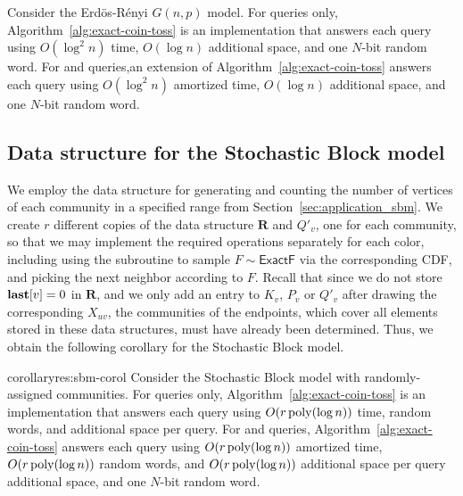 \begin{theorem}
Consider the Erd\"{o}s-R\'{e}nyi $G(n,p)$ model. For  queries only, Algorithm~\ref{alg:exact-coin-toss} is an implementation that answers each query using $O(\log^2 n)$ time, $O(\log n)$ additional space, and one $N$-bit random word. For  and  queries,an extension of Algorithm~\ref{alg:exact-coin-toss} answers each query using $O(\log^2 n)$ amortized time, $O(\log n)$ additional space, and one $N$-bit random word.
\end{theorem}

\subsection{Data structure for the Stochastic Block model}\label{sec:det-sbm}

We employ the data structure for generating and counting the number of vertices of each community in a specified range from Section~\ref{sec:application_sbm}. We create $r$ different copies of the data structure $\mathbf{R}$ and $Q'_v$, one for each community, so that we may implement the required operations separately for each color, including using the  subroutine to sample $F\sim\mathsf{ExactF}$ via the corresponding CDF, and picking the next neighbor according to $F$. Recall that since we do not store $\mathbf{last}[v] = 0$ in $\mathbf{R}$, and we only add an entry to $K_v$, $P_v$ or $Q'_v$ after drawing the corresponding $X_{uv}$, the communities of the endpoints, which cover all elements stored in these data structures, must have already been determined. Thus, we obtain the following corollary for the Stochastic Block model.

\begin{restatable}{corollary}{res:sbm-corol}
Consider the Stochastic Block model with randomly-assigned communities. For  queries only, Algorithm~\ref{alg:exact-coin-toss} is an implementation that answers each query using $O(r\,\mathrm{poly}(\log n))$ time, random words, and additional space per query. For  and  queries, Algorithm~\ref{alg:exact-coin-toss} answers each query using $O(r\,\mathrm{poly}(\log n))$ amortized time, $O(r\,\mathrm{poly}(\log n))$ random words, and $O(r\,\mathrm{poly}(\log n))$ additional space per query additional space, and one $N$-bit random word.
\end{restatable}

